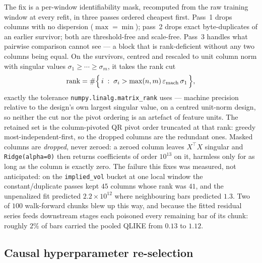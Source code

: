The fix is a per-window identifiability mask, recomputed from the raw training
window at every refit, in three passes ordered cheapest first. Pass~1 drops
columns with no dispersion ($\max = \min$); pass~2 drops exact byte-duplicates of
an earlier survivor; both are threshold-free and scale-free. Pass~3 handles what
pairwise comparison cannot see --- a block that is rank-deficient without any two
columns being equal. On the survivors, centred and rescaled to unit column norm
with singular values $\sigma_1 \ge \cdots \ge \sigma_m$, it takes the rank cut
\begin{equation}
\mathrm{rank} = \#\Bigl\{\, i \;:\; \sigma_i > \max(n,m)\, \varepsilon_{\mathrm{mach}}\, \sigma_1 \,\Bigr\},
\label{eq:rank_cut}
\end{equation}
exactly the tolerance \texttt{numpy.linalg.matrix\_rank} uses --- machine precision
relative to the design's own largest singular value, on a centred unit-norm
design, so neither the cut nor the pivot ordering is an artefact of feature units.
The retained set is the column-pivoted QR pivot order truncated at that rank:
greedy most-independent-first, so the dropped columns are the redundant ones.
Masked columns are \emph{dropped}, never zeroed: a zeroed column leaves $X^\top X$
singular and \texttt{Ridge(alpha=0)} then returns coefficients of order $10^{13}$
on it, harmless only for as long as the column is exactly zero. The failure this
fixes was measured, not anticipated: on the \texttt{implied\_vol} bucket at one
local window the constant/duplicate passes kept $45$ columns whose rank was $41$,
and the unpenalized fit predicted $2.2\times10^{12}$ where neighbouring bars
predicted $1.3$. Two of $100$ walk-forward chunks blew up this way, and because the
fitted residual series feeds downstream stages each poisoned every remaining bar of
its chunk: roughly $2\%$ of bars carried the pooled QLIKE from $0.13$ to $1.12$.

\subsection{Causal hyperparameter re-selection}
\label{sec:alg_tune}

